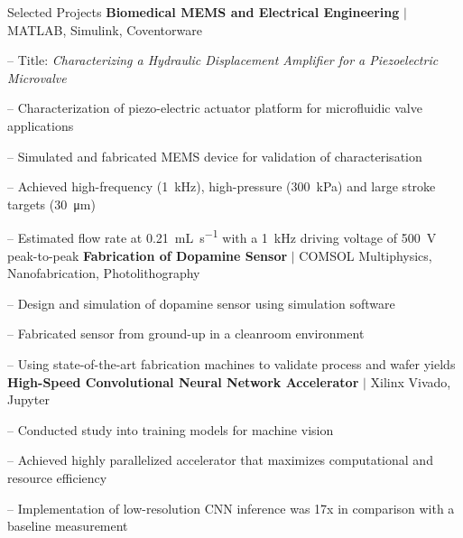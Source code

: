 \begin{rubric}{\faTasks[solid]  Selected Projects}
\entry*[2022][] \textbf{Biomedical MEMS and Electrical Engineering} $|$ MATLAB, Simulink, Coventorware \par
	-- Title: \emph{Characterizing a Hydraulic Displacement Amplifier for a Piezoelectric Microvalve} \par
	-- Characterization of piezo-electric actuator platform for microfluidic valve applications \par
	-- Simulated and fabricated MEMS device for validation of characterisation \par
	-- Achieved high-frequency (\SI{1}{\kilo\hertz}), high-pressure (\SI{300}{\kilo\pascal}) and large stroke targets (\SI{30}{\micro\meter}) \par
	-- Estimated flow rate at \SI{0.21}{\milli\liter\per\second} with a \SI{1}{\kilo\hertz} driving voltage of \SI{500}{\volt} peak-to-peak
%
\entry*[2021][] \textbf{Fabrication of Dopamine Sensor} $|$ COMSOL Multiphysics, Nanofabrication, Photolithography \par
	-- Design and simulation of dopamine sensor using simulation software \par
	-- Fabricated sensor from ground-up in a cleanroom environment \par
	-- Using state-of-the-art fabrication machines to validate process and wafer yields
%
\entry*[2020][] \textbf{High-Speed Convolutional Neural Network Accelerator} $|$ Xilinx Vivado, Jupyter \par
	-- Conducted study into training models for machine vision \par
	-- Achieved highly parallelized accelerator that maximizes computational and resource efficiency \par
	-- Implementation of low-resolution CNN inference was 17x in comparison with a baseline measurement
\end{rubric}